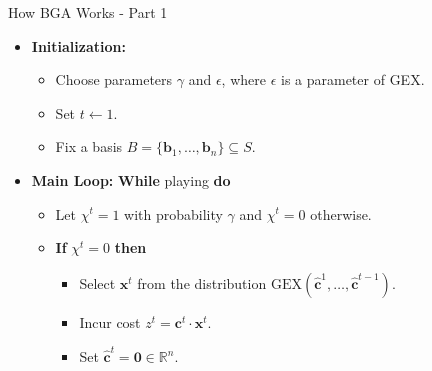 \documentclass{beamer}
\begin{document}
\begin{frame}{How BGA Works - Part 1}
    \scriptsize %

    \begin{itemize}
        \item \textbf{Initialization:}
        \begin{itemize}
            \item Choose parameters $\gamma$ and $\epsilon$, where $\epsilon$ is a parameter of GEX.
            \item Set $t \gets 1$.
            \item Fix a basis $B = \{\mathbf{b}_1, \ldots, \mathbf{b}_n\} \subseteq S$.
        \end{itemize}
        \pause

        \item \textbf{Main Loop:} \textbf{While} playing \textbf{do}
        \begin{itemize}
            \item Let $\chi^t = 1$ with probability $\gamma$ and $\chi^t = 0$ otherwise.
            \pause

            \item \textbf{If} $\chi^t = 0$ \textbf{then}
            \begin{itemize}
                \item Select $\mathbf{x}^t$ from the distribution $\text{GEX}(\hat{\mathbf{c}}^1, \ldots, \hat{\mathbf{c}}^{t-1})$.
                \item Incur cost $z^t = \mathbf{c}^t \cdot \mathbf{x}^t$.
                \item Set $\hat{\mathbf{c}}^t = \mathbf{0} \in \mathbb{R}^n$.
            \end{itemize}
        \end{itemize}
    \end{itemize}
\end{frame}
\end{document}
